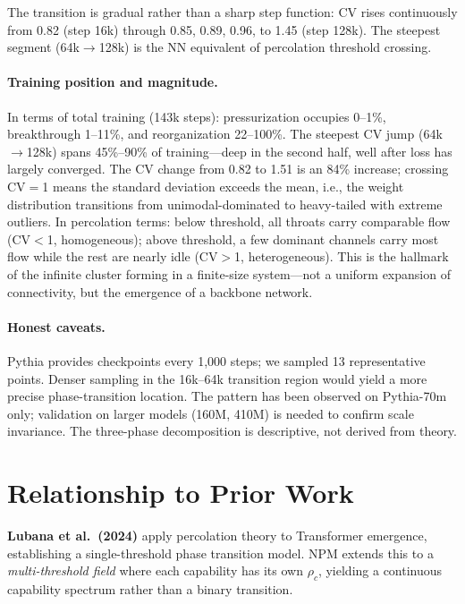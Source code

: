 \documentclass[11pt,a4paper]{article}
\begin{document}
The transition is gradual rather than a sharp step function: CV rises
continuously from 0.82 (step 16k) through 0.85, 0.89, 0.96, to 1.45
(step 128k). The steepest segment (64k$\to$128k) is the NN equivalent of
percolation threshold crossing.

\paragraph{Training position and magnitude.}
In terms of total training (143k steps): pressurization occupies 0--1\%,
breakthrough 1--11\%, and reorganization 22--100\%. The steepest CV jump
(64k$\to$128k) spans 45\%--90\% of training---deep in the second half, well
after loss has largely converged. The CV change from 0.82 to 1.51 is an
84\% increase; crossing CV$=$1 means the standard deviation exceeds the
mean, i.e., the weight distribution transitions from unimodal-dominated to
heavy-tailed with extreme outliers. In percolation terms: below threshold,
all throats carry comparable flow (CV$<$1, homogeneous); above threshold,
a few dominant channels carry most flow while the rest are nearly idle
(CV$>$1, heterogeneous). This is the hallmark of the infinite cluster
forming in a finite-size system---not a uniform expansion of connectivity,
but the emergence of a backbone network.

\paragraph{Honest caveats.}
Pythia provides checkpoints every 1,000 steps; we sampled 13 representative
points. Denser sampling in the 16k--64k transition region would yield a
more precise phase-transition location. The pattern has been observed on
Pythia-70m only; validation on larger models (160M, 410M) is needed to
confirm scale invariance. The three-phase decomposition is descriptive,
not derived from theory.

\section{Relationship to Prior Work}

\textbf{Lubana et al.\ (2024)} \citep{lubana2024percolation} apply percolation
theory to Transformer emergence, establishing a single-threshold phase
transition model. NPM extends this to a \emph{multi-threshold field} where
each capability has its own $\rho_c$, yielding a continuous capability spectrum
rather than a binary transition.
\end{document}
